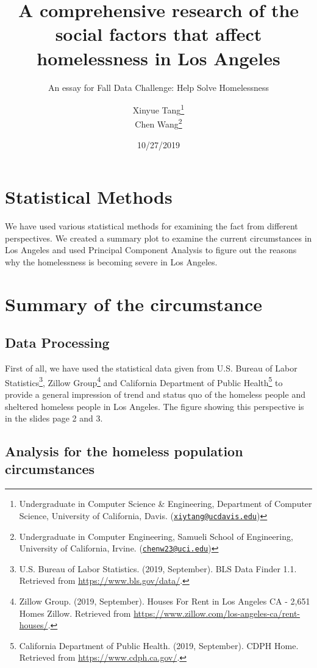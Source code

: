 \documentclass[]{article}
\title{A comprehensive research of the social factors that affect homelessness
in Los Angeles}
\subtitle{An essay for Fall Data Challenge: Help Solve Homelessness}
\author{Xinyue Tang\footnote{Undergraduate in Computer Science \& Engineering,
  Department of Computer Science, University of California, Davis.
  (\href{mailto:xiytang@ucdavis.edu}{\nolinkurl{xiytang@ucdavis.edu}})} \\ Chen Wang\footnote{Undergraduate in Computer Engineering, Samueli School
  of Engineering, University of California, Irvine.
  (\href{mailto:chenw23@uci.edu}{\nolinkurl{chenw23@uci.edu}})}}
\date{10/27/2019}
\let\rmarkdownfootnote\footnote%
\def\footnote{\protect\rmarkdownfootnote}
\begin{document}
\maketitle

{
\setcounter{tocdepth}{3}
\tableofcontents
}
\newpage

\hypertarget{statistical-methods}{%
\section{Statistical Methods}\label{statistical-methods}}

We have used various statistical methods for examining the fact from
different perspectives. We created a summary plot to examine the current
circumstances in Los Angeles and used Principal Component Analysis to
figure out the reasons why the homelessness is becoming severe in Los
Angeles.

\hypertarget{summary-of-the-circumstance}{%
\section{Summary of the
circumstance}\label{summary-of-the-circumstance}}

\hypertarget{data-processing}{%
\subsection{Data Processing}\label{data-processing}}

First of all, we have used the statistical data given from U.S. Bureau
of Labor Statistics\footnote{U.S. Bureau of Labor Statistics. (2019,
  September). BLS Data Finder 1.1. Retrieved from
  \url{https://www.bls.gov/data/}.}, Zillow Group\footnote{Zillow Group.
  (2019, September). Houses For Rent in Los Angeles CA - 2,651 Homes
  \textbar{} Zillow. Retrieved from
  \url{https://www.zillow.com/los-angeles-ca/rent-houses/}.} and
California Department of Public Health\footnote{California Department of
  Public Health. (2019, September). CDPH Home. Retrieved from
  \url{https://www.cdph.ca.gov/}.} to provide a general impression of
trend and status quo of the homeless people and sheltered homeless
people in Los Angeles. The figure showing this perspective is in the
slides page 2 and 3.

\hypertarget{analysis-for-the-homeless-population-circumstances}{%
\subsection{Analysis for the homeless population
circumstances}\label{analysis-for-the-homeless-population-circumstances}}
\end{document}
